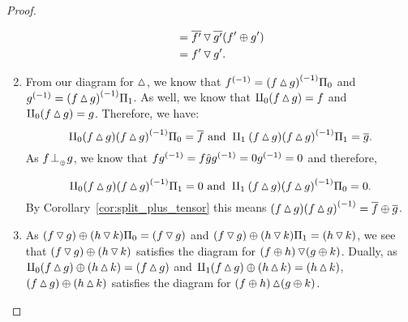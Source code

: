\begin{proof}
\begin{enumerate}[{(}i{)}]
\begin{align*}
          & = \rst{f'} \tjleft \rst{g'}  (f'\+g') \\
          & = f'\tjleft g'.
      \end{align*}
    \item From our diagram for $\tjright$, we know that $\inv{f} = \inv{(f\tjright g)} \Pi_0$ and
      $\inv{g} = \inv{(f\tjright g)} \Pi_1$. As well, we know that $\cpa(f\tjright g) = f$ and
      $\cpa(f\tjright g) = g$.
      Therefore, we have:
      \[
         \cpa(f\tjright g)\inv{(f\tjright g)} \Pi_0 = \rst{f} \text{ and  }
          \cpb(f\tjright g)\inv{(f\tjright g)} \Pi_1 = \rst{g}.
      \]
      As $f\tperp g$, we know that $f\inv{g} = f \rg{g} \inv{g} = 0 \inv{g} = 0$ and therefore,

      \[
         \cpa(f\tjright g)\inv{(f\tjright g)} \Pi_1 = 0 \text{ and  }
          \cpb(f\tjright g)\inv{(f\tjright g)} \Pi_0 = 0.
      \]
      By Corollary~\ref{cor:split_plus_tensor} this means
      $(f\tjright g)\inv{(f\tjright g)} = \rst{f} \+ \rst{g}$.
    \item As $(f\tjleft g)\+ (h\tjleft k)\Pi_0 = (f\tjleft g)$ and
      $(f\tjleft g)\+ (h\tjleft k) \Pi_1 = (h\tjleft k)$, we see that
      $(f\tjleft g)\+ (h\tjleft k)$ satisfies the diagram for $(f\+h)\tjleft(g\+k)$. Dually, as
      $\cpa (f\tjright g)\+ (h\tjright k) = (f\tjright g)$ and
      $\cpb(f\tjright g)\+ (h\tjright k) = (h\tjright k)$, $(f\tjright g)\+ (h\tjright k)$ satisfies
      the diagram for $(f\+h)\tjright(g\+k)$.
  \end{enumerate}
\end{proof}


